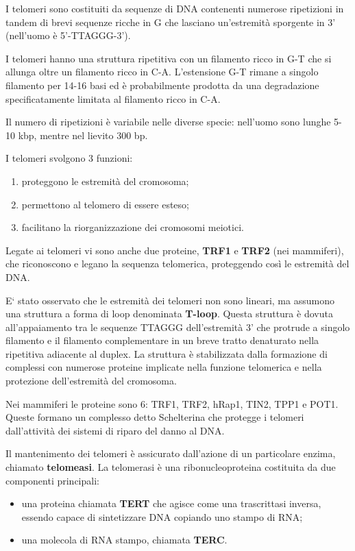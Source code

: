\documentclass[11pt]{book}
\begin{document}
I telomeri sono costituiti da sequenze di DNA contenenti numerose
ripetizioni in tandem di brevi sequenze ricche in G che lasciano
un'estremità sporgente in 3' (nell'uomo è 5'-TTAGGG-3').

I telomeri hanno una struttura ripetitiva con un filamento ricco in G-T
che si allunga oltre un filamento ricco in C-A. L'estensione G-T rimane
a singolo filamento per 14-16 basi ed è probabilmente prodotta da una
degradazione specificatamente limitata al filamento ricco in C-A.

Il numero di ripetizioni è variabile nelle diverse specie: nell'uomo
sono lunghe 5-10 kbp, mentre nel lievito 300 bp.

I telomeri svolgono 3 funzioni:

\begin{enumerate}
\def\labelenumi{\arabic{enumi}.}
\itemsep1pt\parskip0pt
\item
  proteggono le estremità del cromosoma;
\item
  permettono al telomero di essere esteso;
\item
  facilitano la riorganizzazione dei cromosomi meiotici.
\end{enumerate}

Legate ai telomeri vi sono anche due proteine, \textbf{TRF1} e
\textbf{TRF2} (nei mammiferi), che riconoscono e legano la sequenza
telomerica, proteggendo così le estremità del DNA.

E` stato osservato che le estremità dei telomeri non sono lineari, ma
assumono una struttura a forma di loop denominata \textbf{T-loop}.
Questa struttura è dovuta all'appaiamento tra le sequenze TTAGGG
dell'estremità 3' che protrude a singolo filamento e il filamento
complementare in un breve tratto denaturato nella ripetitiva adiacente
al duplex. La struttura è stabilizzata dalla formazione di complessi con
numerose proteine implicate nella funzione telomerica e nella protezione
dell'estremità del cromosoma.

Nei mammiferi le proteine sono 6: TRF1, TRF2, hRap1, TIN2, TPP1 e POT1.
Queste formano un complesso detto Schelterina che protegge i telomeri
dall'attività dei sistemi di riparo del danno al DNA.

Il mantenimento dei telomeri è assicurato dall'azione di un particolare
enzima, chiamato \textbf{telomeasi}. La telomerasi è una
ribonucleoproteina costituita da due componenti principali:

\begin{itemize}
\itemsep1pt\parskip0pt
\item
  una proteina chiamata \textbf{TERT} che agisce come una trascrittasi
  inversa, essendo capace di sintetizzare DNA copiando uno stampo di
  RNA;
\item
  una molecola di RNA stampo, chiamata \textbf{TERC}.
\end{itemize}
\end{document}

